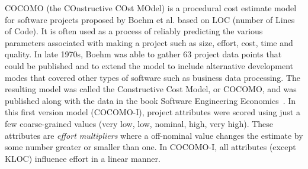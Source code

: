 \documentclass[sigconf,review]{acmart}
\begin{document}
COCOMO (the COnstructive COst MOdel) is a procedural cost estimate model for software projects proposed by Boehm et al. based on LOC (number of Lines of Code). It is often used as a process of reliably predicting the various parameters associated with making a project such as size, effort, cost, time and quality. In late 1970s, Boehm was able to gather 63 project data points that could be published and to extend the model to
include alternative development modes that covered
other types of software such as business data
processing.  The resulting model was called the
Constructive Cost Model, or COCOMO, and was
published along with the data in the book Software
Engineering Economics~\cite{boehm1981software}. 
In this first version model (COCOMO-I), project attributes
were scored using just a few coarse-grained values (very low,
low, nominal, high, very high). These attributes
are {\em effort multipliers} where
a off-nominal value changes the estimate by some number
greater or smaller than one.
In COCOMO-I, all attributes (except KLOC)
influence effort in a linear manner.



\end{document}
